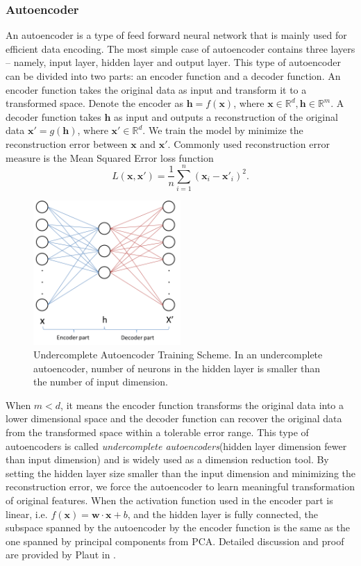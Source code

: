 \documentclass[11pt,a4paper]{article}
\theoremstyle{definition}
\numberwithin{equation}{section}
\let\vec\mathbf
\begin{document}
	\subsubsection{Autoencoder}
	An autoencoder is a type of feed forward neural network that is mainly used for efficient data encoding\cite[chapter 14]{Deep_Learning}. The most simple case of autoencoder contains three layers -- namely, input layer, hidden layer and output layer. This type of autoencoder can be divided into two parts: an encoder function and a decoder function. An encoder function takes the original data as input and transform it to a transformed space. Denote the encoder as $\vec h = f(\vec x)$, where $\vec x\in \mathbb R^d, \vec h\in \mathbb R^m$. A decoder function takes $\vec h$ as input and outputs a reconstruction of the original data $\vec x' = g(\vec h)$, where $\vec x'\in \mathbb R^d$. We train the model by minimize the reconstruction error between $\vec x$ and $\vec x'$. Commonly used reconstruction error measure is the Mean Squared Error loss function 
	\begin{equation}
	L(\vec x,\vec x') = \frac{1}{n}\sum_{i=1}^{n}(\vec x_i-\vec x'_i)^2. 
	\end{equation}
	\begin{figure}[h!]
		\centering
		\includegraphics[width=0.5\textwidth]{ae.png}
		\caption{Undercomplete Autoencoder Training Scheme. In an undercomplete autoencoder, number of neurons in the hidden layer is smaller than the number of input dimension.}
	\end{figure}

	
	When $m<d$, it means the encoder function transforms the original data into a lower dimensional space and the decoder function can recover the original data from the transformed space within a tolerable error range. This type of autoencoders is called \textit{undercomplete autoencoders}(hidden layer dimension fewer than input dimension) and is widely used as a dimension reduction tool. By setting the hidden layer size smaller than the input dimension and minimizing the reconstruction error, we force the autoencoder to learn meaningful transformation of original features.
	When the activation function used in the encoder part is linear, i.e. $f(\vec x) = \vec w\cdot\vec x + b$, and the hidden layer is fully connected, the subspace spanned by the autoencoder by the encoder function is the same as the one spanned by principal components from PCA. Detailed discussion and proof are provided by Plaut in \cite{Plaut}.
	
\end{document}
